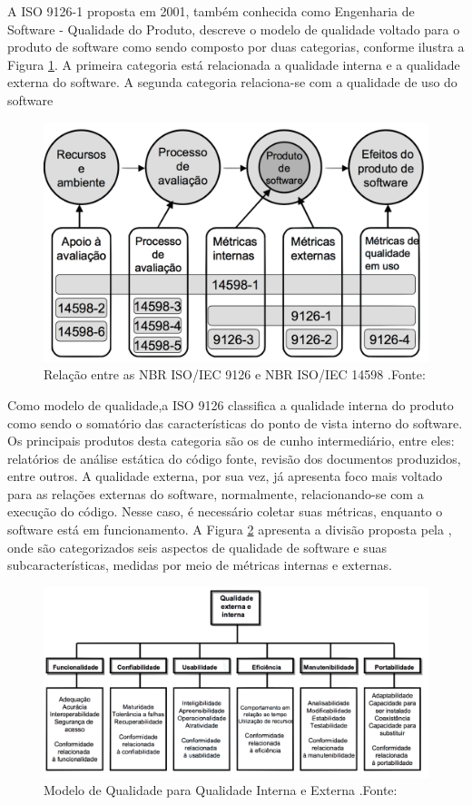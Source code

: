  A ISO 9126-1 proposta em 2001, também conhecida como Engenharia de Software - Qualidade do Produto, descreve o modelo de qualidade voltado para o produto de software como sendo composto por duas categorias, conforme ilustra a Figura \ref{img:relacao_iso}. A primeira categoria está relacionada a qualidade interna e a qualidade externa do software. A segunda categoria relaciona-se com a qualidade de uso do software \cite{_nbr_2016}
\graphicspath{{figuras/}}
\begin{figure}[h!]
\centering
\includegraphics[scale=0.40]{ISO}
\caption{Relação entre as NBR ISO/IEC 9126 e NBR ISO/IEC 14598 .Fonte:\cite{_nbr_2016}}
\label{img:relacao_iso}
\end{figure}

 Como modelo de qualidade,a ISO 9126 classifica a qualidade interna do produto como sendo o somatório das características do ponto de vista interno do software. Os principais produtos desta categoria são os de cunho intermediário, entre eles: relatórios de análise estática do código fonte, revisão dos documentos produzidos, entre outros. A qualidade externa, por sua vez, já apresenta foco mais voltado para as relações externas do software, normalmente, relacionando-se com a execução do código. Nesse caso, é necessário coletar suas métricas, enquanto o software está em funcionamento. A Figura \ref{img:modelo_qualidade} apresenta a divisão proposta pela \cite{_nbr_2016}, onde são categorizados seis aspectos de qualidade de software e suas subcaracterísticas, medidas por meio de métricas internas e externas. 
\graphicspath{{figuras/}}
\begin{figure}[h]
\centering
\includegraphics[scale=0.50]{Modelo_de_Qualidade}
\caption{Modelo de Qualidade para Qualidade Interna e Externa .Fonte:\cite{_nbr_2016}}
\label{img:modelo_qualidade}
\end{figure}

